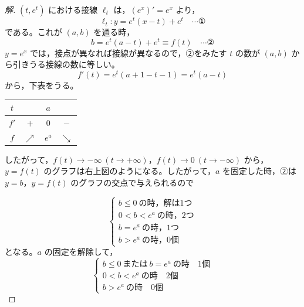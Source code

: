 \documentclass[../main.tex]{subfiles}
\begin{document}
\begin{proof}[解]
  $(t,e^t)$ における接線 $\ell_t$ は，$(e^x)'=e^x$ より，
  \[
    \ell_t: y=e^t(x-t)+e^t \quad \cdots \text{①}
  \]
  である。これが $(a,b)$ を通る時，
  \[
    b=e^t(a-t)+e^t\equiv f(t) \quad \cdots \text{②}
  \]
  $y=e^x$ では，接点が異なれば接線が異なるので，②をみたす $t$ の数が $(a,b)$ から引きうる接線の数に等しい。
  \[
    f'(t)=e^t(a+1-t-1)=e^t(a-t)
  \]
  から，下表をうる。
  \begin{center}
    \begin{tabular}{c|ccc}
      $t$ & & $a$ & \\
      \hline
      $f'$ & $+$ & $0$ & $-$ \\
      \hline
      $f$ & $\nearrow$ & $e^a$ & $\searrow$
    \end{tabular}
  \end{center}
  したがって，$f(t)\to-\infty\ (t\to+\infty)$，$f(t)\to0\ (t\to-\infty)$ から，$y=f(t)$ のグラフは右上図のようになる。したがって，$a$ を固定した時，②は $y=b$，$y=f(t)$ のグラフの交点で与えられるので

  \begin{center}
  \end{center}

  \[
    \begin{cases}
      b\le0\ \text{の時，解は}1\text{つ} \\
      0<b<e^a\ \text{の時，}2\text{つ} \\
      b=e^a\ \text{の時，}1\text{つ} \\
      b>e^a\ \text{の時，}0\text{個}
    \end{cases}
  \]
  となる。$a$ の固定を解除して，
  \[
    \begin{cases}
      b\le0\ \text{または}\ b=e^a\ \text{の時}\quad 1\text{個} \\
      0<b<e^a\ \text{の時}\quad 2\text{個} \\
      b>e^a\ \text{の時}\quad 0\text{個}
    \end{cases}
  \]
\end{proof}
\end{document}
